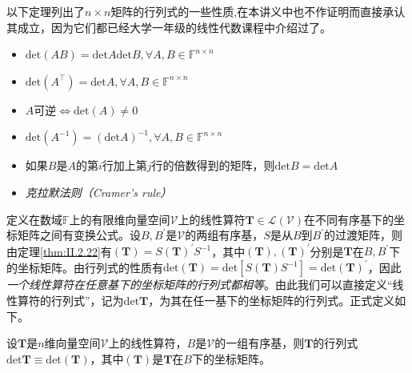 \documentclass[main.tex]{subfiles}
\begin{document}
以下定理列出了$n\times n$矩阵的行列式的一些性质,在本讲义中也不作证明而直接承认其成立，因为它们都已经大学一年级的线性代数课程中介绍过了。

\begin{theorem}\label{thm:II.2.24}
    \quad
    \begin{itemize}
        \item $\mathrm{det}\left(AB\right)=\mathrm{det}A\mathrm{det}B,\forall A,B\in\mathbb{F}^{n\times n}$
        \item $\mathrm{det}\left(A^\intercal\right)=\mathrm{det}A,\forall A,B\in\mathbb{F}^{n\times n}$
        \item ${A}$可逆$\Leftrightarrow\mathrm{det}\left(A\right)\neq 0$
        \item $\mathrm{det}\left(A^{-1}\right)=\left(\mathrm{det}A\right)^{-1},\forall A,B\in\mathbb{F}^{n\times n}$
        \item 如果$B$是$A$的第$i$行加上第$j$行的倍数得到的矩阵，则$\mathrm{det}B=\mathrm{det}A$

        \item \emph{克拉默法则（Cramer's rule）}\cite[\S1.5]{周胜林2012线性代数}
    \end{itemize}
\end{theorem}

定义在数域$\mathbb{F}$上的有限维向量空间$\mathcal{V}$上的线性算符$\mathbf{T}\in\mathcal{L}\left(\mathcal{V}\right)$在不同有序基下的坐标矩阵之间有变换公式。设$B,B^\prime$是$\mathcal{V}$的两组有序基，$S$是从$B$到$B^\prime$的过渡矩阵，则由定理\ref{thm:II.2.22}有$\left(\mathbf{T}\right)=S\left(\mathbf{T}\right)^\prime S^{-1}$，其中$\left(\mathbf{T}\right),\left(\mathbf{T}\right)^\prime$分别是$\mathbf{T}$在$B,B^\prime$下的坐标矩阵。由行列式的性质有$\mathrm{det}\left(\mathbf{T}\right)=\mathrm{det}\left[S\left(\mathbf{T}\right)S^{-1}\right]=\mathrm{det}\left(\mathbf{T}\right)^\prime$，因此\emph{一个线性算符在任意基下的坐标矩阵的行列式都相等}。由此我们可以直接定义“线性算符的行列式”，记为$\mathrm{det}\mathbf{T}$，为其在任一基下的坐标矩阵的行列式。正式定义如下。

\begin{definition}[线性算符的行列式]\label{def:II.2.18}
    设$\mathbf{T}$是$n$维向量空间$\mathcal{V}$上的线性算符，$B$是$\mathcal{V}$的一组有序基，则$\mathbf{T}$的行列式$\mathrm{det}\mathbf{T}\equiv\mathrm{det}\left(\mathbf{T}\right)$，其中$\left(\mathbf{T}\right)$是$\mathbf{T}$在$B$下的坐标矩阵。
\end{definition}

\end{document}
